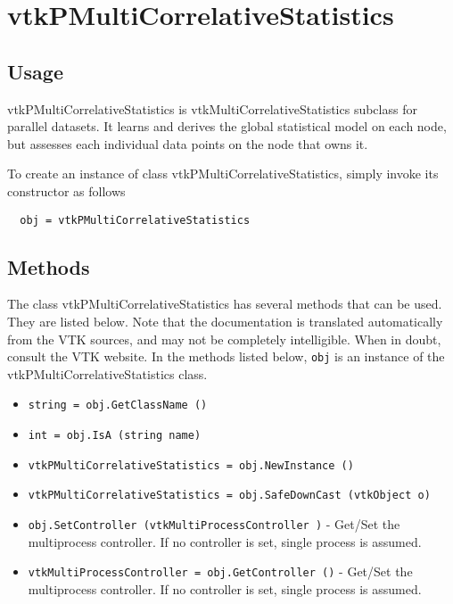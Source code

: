 \section{vtkPMultiCorrelativeStatistics}

\subsection{Usage}

 vtkPMultiCorrelativeStatistics is vtkMultiCorrelativeStatistics subclass for parallel datasets.
 It learns and derives the global statistical model on each node, but assesses each 
 individual data points on the node that owns it.

To create an instance of class vtkPMultiCorrelativeStatistics, simply
invoke its constructor as follows
\begin{verbatim}
  obj = vtkPMultiCorrelativeStatistics
\end{verbatim}
\subsection{Methods}

The class vtkPMultiCorrelativeStatistics has several methods that can be used.
  They are listed below.
Note that the documentation is translated automatically from the VTK sources,
and may not be completely intelligible.  When in doubt, consult the VTK website.
In the methods listed below, \verb|obj| is an instance of the vtkPMultiCorrelativeStatistics class.
\begin{itemize}
\item  \verb|string = obj.GetClassName ()|

\item  \verb|int = obj.IsA (string name)|

\item  \verb|vtkPMultiCorrelativeStatistics = obj.NewInstance ()|

\item  \verb|vtkPMultiCorrelativeStatistics = obj.SafeDownCast (vtkObject o)|

\item  \verb|obj.SetController (vtkMultiProcessController )| -  Get/Set the multiprocess controller. If no controller is set,
 single process is assumed.

\item  \verb|vtkMultiProcessController = obj.GetController ()| -  Get/Set the multiprocess controller. If no controller is set,
 single process is assumed.

\end{itemize}
